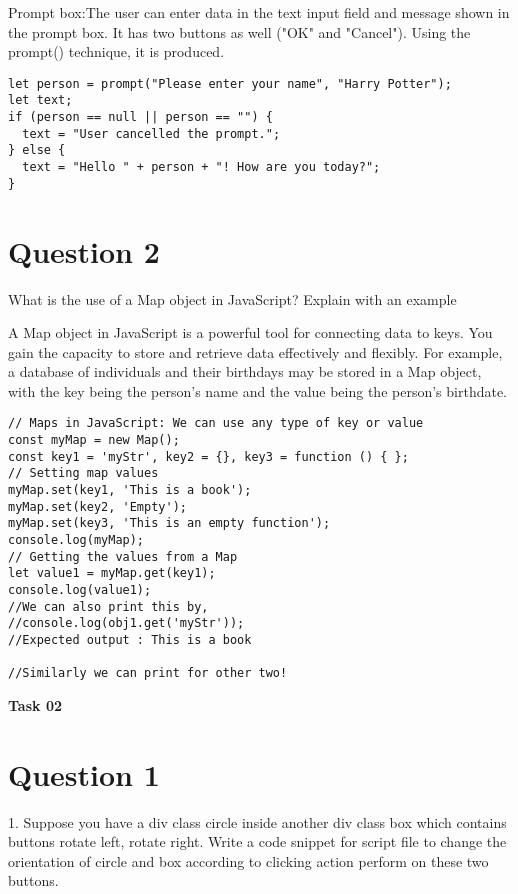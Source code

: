 \documentclass{article}
\begin{document}
Prompt box:The user can enter data in the text input field and message shown in the prompt box. It has two buttons as well ("OK" and "Cancel"). Using the prompt() technique, it is produced.

\begin{lstlisting}[caption=Prompt Box Snippet]
let person = prompt("Please enter your name", "Harry Potter");
let text;
if (person == null || person == "") {
  text = "User cancelled the prompt.";
} else {
  text = "Hello " + person + "! How are you today?";
}
\end{lstlisting}
\vspace{18\baselineskip}

\section*{Question 2}
What is the use of a Map object in JavaScript? Explain with an example\vspace{3\baselineskip}

A Map object in JavaScript is a powerful tool for connecting data to keys. You gain the capacity to store and retrieve data effectively and flexibly. For example, a database of individuals and their birthdays may be stored in a Map object, with the key being the person's name and the value being the person's birthdate.\vspace{2\baselineskip}
\begin{lstlisting}[caption=Map Object Snippet]
// Maps in JavaScript: We can use any type of key or value
const myMap = new Map();
const key1 = 'myStr', key2 = {}, key3 = function () { };
// Setting map values
myMap.set(key1, 'This is a book');
myMap.set(key2, 'Empty');
myMap.set(key3, 'This is an empty function');
console.log(myMap);
// Getting the values from a Map 
let value1 = myMap.get(key1);
console.log(value1);
//We can also print this by,
//console.log(obj1.get('myStr'));
//Expected output : This is a book

//Similarly we can print for other two!
\end{lstlisting}

\vspace{24\baselineskip}
\textbf{\Large Task 02}
\section*{Question 1}
1. Suppose you have a div class circle inside another div class box which contains buttons
rotate left, rotate right. Write a code snippet for script file to change the orientation of
circle and box according to clicking action perform on these two buttons.
\vspace{2\baselineskip}
\end{document}
